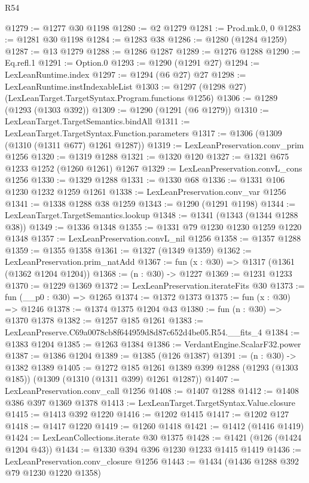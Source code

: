 \begin{lexlean}{R54}
\begin{coremodule}
@1279 := @1277 @30 @1198
@1280 := @2 @1279
@1281 := Prod.mk.{0, 0}
@1283 := @1281 @30 @1198
@1284 := @1283 @38
@1286 := @1280 (@1284 @1259)
@1287 := @13 @1279
@1288 := @1286 @1287
@1289 := @1276 @1288
@1290 := Eq.refl.{1}
@1291 := Option.{0}
@1293 := @1290 (@1291 @27)
@1294 := LexLeanRuntime.index
@1297 := @1294 (@6 @27) @27
@1298 := LexLeanRuntime.instIndexableList
@1303 := @1297 (@1298 @27) (LexLeanTarget.TargetSyntax.Program.functions @1256)
@1306 := @1289 (@1293 (@1303 @392))
@1309 := @1290 (@1291 (@6 @1279))
@1310 := LexLeanTarget.TargetSemantics.bindAll
@1311 := LexLeanTarget.TargetSyntax.Function.parameters
@1317 := @1306 (@1309 (@1310 (@1311 @677) @1261 @1287))
@1319 := LexLeanPreservation.conv_prim @1256
@1320 := @1319 @1288
@1321 := @1320 @120
@1327 := @1321 @675 @1233 @1252 (@1260 @1261) @1267
@1329 := LexLeanPreservation.convL_cons @1256
@1330 := @1329 @1288
@1331 := @1330 @68
@1336 := @1331 @106 @1230 @1232 @1259 @1261
@1338 := LexLeanPreservation.conv_var @1256
@1341 := @1338 @1288 @38 @1259
@1343 := @1290 (@1291 @1198)
@1344 := LexLeanTarget.TargetSemantics.lookup
@1348 := @1341 (@1343 (@1344 @1288 @38))
@1349 := @1336 @1348
@1355 := @1331 @79 @1230 @1230 @1259 @1220 @1348
@1357 := LexLeanPreservation.convL_nil @1256
@1358 := @1357 @1288
@1359 := @1355 @1358
@1361 := @1327 (@1349 @1359)
@1362 := LexLeanPreservation.prim_natAdd
@1367 := fun (x : @30) => @1317 (@1361 (@1362 @1204 @1204))
@1368 := (n : @30) -> @1227
@1369 := @1231 @1233
@1370 := @1229 @1369
@1372 := LexLeanPreservation.iterateFits @30
@1373 := fun (__p0 : @30) => @1265
@1374 := @1372 @1373
@1375 := fun (x : @30) => @1246
@1378 := @1374 @1375 @1204 @43
@1380 := fun (n : @30) => @1370 @1378
@1382 := @1257 @185 @1261
@1383 := LexLeanPreserve.C69a0078cb8f644959d8d87c652d4be05.R54.__fits_4
@1384 := @1383 @1204
@1385 := @1263 @1384
@1386 := VerdantEngine.ScalarF32.power
@1387 := @1386 @1204
@1389 := @1385 (@126 @1387)
@1391 := (n : @30) -> @1382 @1389
@1405 := @1272
    @185
    @1261
    @1389
    @399
    @1288
    (@1293 (@1303 @185))
    (@1309 (@1310 (@1311 @399) @1261 @1287))
@1407 := LexLeanPreservation.conv_call @1256
@1408 := @1407 @1288
@1412 := @1408 @386 @397 @1369 @1378
@1413 := LexLeanTarget.TargetSyntax.Value.closure
@1415 := @1413 @392 @1220
@1416 := @1202 @1415
@1417 := @1202 @127
@1418 := @1417 @1220
@1419 := @1260 @1418
@1421 := @1412 (@1416 @1419)
@1424 := LexLeanCollections.iterate @30 @1375
@1428 := @1421 (@126 (@1424 @1204 @43))
@1434 := @1330 @394 @396 @1230 @1233 @1415 @1419
@1436 := LexLeanPreservation.conv_closure @1256
@1443 := @1434 (@1436 @1288 @392 @79 @1230 @1220 @1358)

\end{coremodule}
\end{lexlean}
